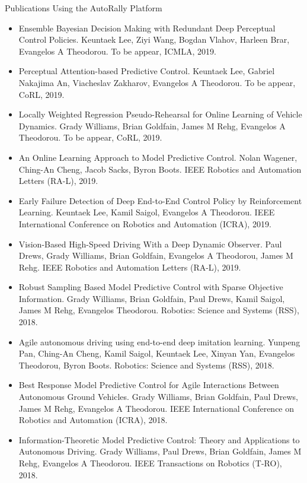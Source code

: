 \documentclass[aspectratio=169]{beamer}
\begin{document}
\begin{frame}{Publications Using the AutoRally Platform}
\begin{multicols}{2}
	\fontsize{5pt}{0}\selectfont
	\begin{itemize}
		\item Ensemble Bayesian Decision Making with Redundant Deep Perceptual Control Policies. Keuntaek Lee, Ziyi Wang, Bogdan Vlahov, Harleen Brar, Evangelos A Theodorou. To be appear, ICMLA, 2019.
		\item Perceptual Attention-based Predictive Control. Keuntaek Lee, Gabriel Nakajima An, Viacheslav Zakharov, Evangelos A Theodorou. To be appear, CoRL, 2019.
		\item Locally Weighted Regression Pseudo-Rehearsal for Online Learning of Vehicle Dynamics. Grady Williams, Brian Goldfain, James M Rehg, Evangelos A Theodorou. To be appear, CoRL, 2019.
		\item An Online Learning Approach to Model Predictive Control. Nolan Wagener, Ching-An Cheng, Jacob Sacks, Byron Boots. IEEE Robotics and Automation Letters (RA-L), 2019.
		\item Early Failure Detection of Deep End-to-End Control Policy by Reinforcement Learning. Keuntaek Lee, Kamil Saigol, Evangelos A Theodorou. IEEE International Conference on Robotics and Automation (ICRA), 2019.
		\item Vision-Based High-Speed Driving With a Deep Dynamic Observer. Paul Drews, Grady Williams, Brian Goldfain, Evangelos A Theodorou, James M Rehg. IEEE Robotics and Automation Letters (RA-L), 2019.
		\item Robust Sampling Based Model Predictive Control with Sparse Objective Information. Grady Williams, Brian Goldfain, Paul Drews, Kamil Saigol, James M Rehg, Evangelos Theodorou. Robotics: Science and Systems (RSS), 2018.
		\item Agile autonomous driving using end-to-end deep imitation learning. Yunpeng Pan, Ching-An Cheng, Kamil Saigol, Keuntaek Lee, Xinyan Yan, Evangelos Theodorou, Byron Boots. Robotics: Science and Systems (RSS), 2018.
		\item Best Response Model Predictive Control for Agile Interactions Between Autonomous Ground Vehicles. Grady Williams, Brian Goldfain, Paul Drews, James M Rehg, Evangelos A Theodorou. IEEE International Conference on Robotics and Automation (ICRA), 2018.
		\item Information-Theoretic Model Predictive Control: Theory and Applications to Autonomous Driving. Grady Williams, Paul Drews, Brian Goldfain, James M Rehg, Evangelos A Theodorou. IEEE Transactions on Robotics (T-RO), 2018.

\end{itemize}
\end{multicols}
\end{frame}
\end{document}
